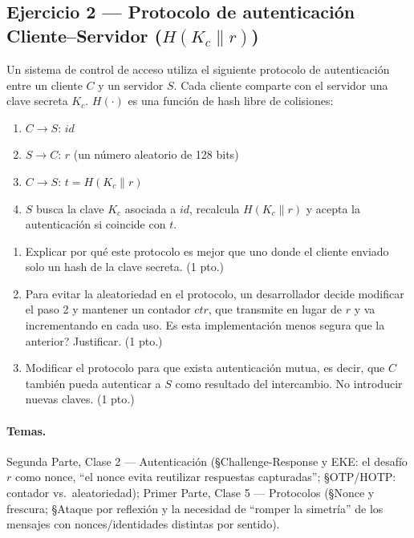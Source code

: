 \subsection{Ejercicio 2 --- Protocolo de autenticación Cliente--Servidor ($H(K_c\|r)$)}

\begin{consigna}
Un sistema de control de acceso utiliza el siguiente protocolo de autenticación
entre un cliente $C$ y un servidor $S$. Cada cliente comparte con el servidor una
clave secreta $K_c$. $H(\cdot)$ es una función de hash libre de colisiones:
\begin{enumerate}
  \item[1.] $C\to S$: $id$
  \item[2.] $S\to C$: $r$ (un número aleatorio de 128 bits)
  \item[3.] $C\to S$: $t = H(K_c\|r)$
  \item[4.] $S$ busca la clave $K_c$ asociada a $id$, recalcula $H(K_c\|r)$ y
  acepta la autenticación si coincide con $t$.
\end{enumerate}

\begin{enumerate}
  \item[a)] Explicar por qué este protocolo es mejor que uno donde el cliente
  enviado solo un hash de la clave secreta. (1 pto.)
  \item[b)] Para evitar la aleatoriedad en el protocolo, un desarrollador decide
  modificar el paso 2 y mantener un contador $ctr$, que transmite en lugar de $r$
  y va incrementando en cada uso. \textquestiondown{}Es esta implementación menos segura que la
  anterior? Justificar. (1 pto.)
  \item[c)] Modificar el protocolo para que exista autenticación mutua, es decir,
  que $C$ también pueda autenticar a $S$ como resultado del intercambio. No
  introducir nuevas claves. (1 pto.)
\end{enumerate}
\end{consigna}

\paragraph{Temas.}
Segunda Parte, Clase 2 --- Autenticación (\S Challenge-Response y EKE: el desafío
$r$ como nonce, ``el nonce evita reutilizar respuestas capturadas''; \S OTP/HOTP:
contador vs.\ aleatoriedad); Primer Parte, Clase 5 --- Protocolos (\S Nonce y
frescura; \S Ataque por reflexión y la necesidad de ``romper la simetría'' de los
mensajes con nonces/identidades distintas por sentido).

